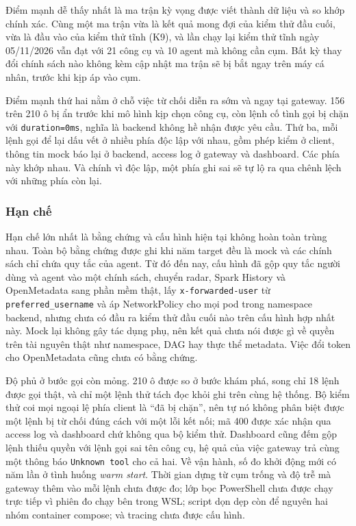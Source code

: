 \documentclass[a4paper]{article}
\begin{document}
Điểm mạnh dễ thấy nhất là ma trận kỳ vọng được viết thành dữ liệu và so khớp chính xác. Cùng một ma trận vừa là kết quả mong đợi của kiểm thử đầu cuối, vừa là đầu vào của kiểm thử tĩnh (K9), và lần chạy lại kiểm thử tĩnh ngày 05/11/2026 vẫn đạt với 21 công cụ và 10 agent mà không cần cụm. Bất kỳ thay đổi chính sách nào không kèm cập nhật ma trận sẽ bị bắt ngay trên máy cá nhân, trước khi kịp áp vào cụm.

Điểm mạnh thứ hai nằm ở chỗ việc từ chối diễn ra sớm và ngay tại gateway. 156 trên 210 ô bị ẩn trước khi mô hình kịp chọn công cụ, còn lệnh cố tình gọi bị chặn với \texttt{duration=0ms}, nghĩa là backend không hề nhận được yêu cầu. Thứ ba, mỗi lệnh gọi để lại dấu vết ở nhiều phía độc lập với nhau, gồm phép kiểm ở client, thông tin mock báo lại ở backend, access log ở gateway và dashboard. Các phía này khớp nhau. Và chính vì độc lập, một phía ghi sai sẽ tự lộ ra qua chênh lệch với những phía còn lại.

\subsubsection{Hạn chế}

Hạn chế lớn nhất là bằng chứng và cấu hình hiện tại không hoàn toàn trùng nhau. Toàn bộ bằng chứng được ghi khi năm target đều là mock và các chính sách chỉ chứa quy tắc của agent. Từ đó đến nay, cấu hình đã gộp quy tắc người dùng và agent vào một chính sách, chuyển radar, Spark History và OpenMetadata sang phần mềm thật, lấy \texttt{x-forwarded-user} từ \texttt{preferred\_username} và áp NetworkPolicy cho mọi pod trong namespace backend, nhưng chưa có đầu ra kiểm thử đầu cuối nào trên cấu hình hợp nhất này. Mock lại không gây tác dụng phụ, nên kết quả chưa nói được gì về quyền trên tài nguyên thật như namespace, DAG hay thực thể metadata. Việc đổi token cho OpenMetadata cũng chưa có bằng chứng.

Độ phủ ở bước gọi còn mỏng. 210 ô được so ở bước khám phá, song chỉ 18 lệnh được gọi thật, và chỉ một lệnh thử tách đọc khỏi ghi trên cùng hệ thống. Bộ kiểm thử coi mọi ngoại lệ phía client là ``đã bị chặn'', nên tự nó không phân biệt được một lệnh bị từ chối đúng cách với một lỗi kết nối; mã 400 được xác nhận qua access log và dashboard chứ không qua bộ kiểm thử. Dashboard cũng đếm gộp lệnh thiếu quyền với lệnh gọi sai tên công cụ, hệ quả của việc gateway trả cùng một thông báo \texttt{Unknown tool} cho cả hai. Về vận hành, số đo khởi động mới có năm lần ở tình huống \textit{warm start}. Thời gian dựng từ cụm trống và độ trễ mà gateway thêm vào mỗi lệnh chưa được đo; lớp bọc PowerShell chưa được chạy trực tiếp vì phiên đo chạy bên trong WSL; script dọn dẹp còn để nguyên hai nhóm container compose; và tracing chưa được cấu hình.
\end{document}
